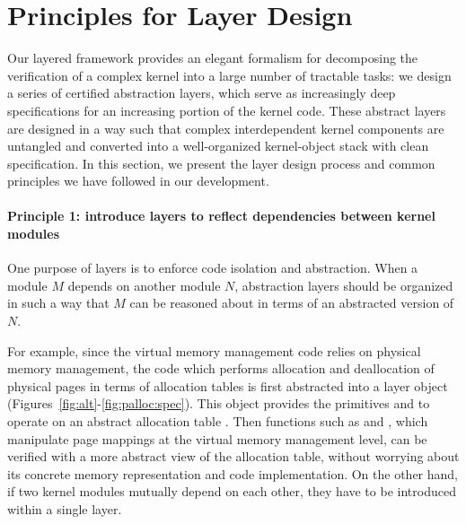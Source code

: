 \section{Principles for Layer Design}
\label{sec:seq:design}

Our layered framework  provides an elegant formalism for decomposing
the verification of a complex kernel into a large number of tractable
tasks: we design a series of certified abstraction layers, which serve
as increasingly deep specifications for an increasing portion
of the kernel code.  These abstract layers are designed in a way such
that complex interdependent kernel components are untangled and
converted into a well-organized kernel-object stack with clean
specification.  In this section, we present the layer design process
and common principles we have followed in our development.


\paragraph{Principle 1: introduce layers to reflect dependencies between kernel modules} One purpose 
of layers is to enforce code isolation and abstraction.
When a module $M$ depends on another module $N$,  
abstraction layers should be organized in such a way that
$M$ can be reasoned about in terms of an abstracted version of $N$.

For example, since the virtual memory management code relies on physical memory management,
the code which performs allocation and
deallocation of physical pages in terms of allocation tables
is first abstracted into a layer object (\cf Figures~\ref{fig:alt}-\ref{fig:palloc:spec}).
This object provides the primitives  and  to operate on an abstract allocation
table .
Then functions such as  and , which manipulate
page mappings at the virtual memory management level,
can be verified with a more
abstract view of the allocation
table, without worrying about its concrete memory representation and code
implementation.
On the other hand, if two kernel modules mutually depend on each other,
they have to be introduced within a single layer.

